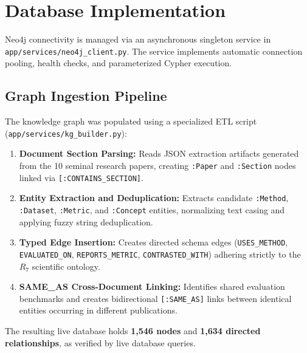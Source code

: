 \section{Database Implementation}
Neo4j connectivity is managed via an asynchronous singleton service in \texttt{app/services/neo4j_client.py}. The service implements automatic connection pooling, health checks, and parameterized Cypher execution.

\subsection{Graph Ingestion Pipeline}
The knowledge graph was populated using a specialized ETL script (\texttt{app/services/kg_builder.py}):
\begin{enumerate}
    \item \textbf{Document Section Parsing:} Reads JSON extraction artifacts generated from the 10 seminal research papers, creating \texttt{:Paper} and \texttt{:Section} nodes linked via \texttt{[:CONTAINS_SECTION]}.
    \item \textbf{Entity Extraction and Deduplication:} Extracts candidate \texttt{:Method}, \texttt{:Dataset}, \texttt{:Metric}, and \texttt{:Concept} entities, normalizing text casing and applying fuzzy string deduplication.
    \item \textbf{Typed Edge Insertion:} Creates directed schema edges (\texttt{USES\_METHOD}, \texttt{EVALUATED\_ON}, \texttt{REPORTS\_METRIC}, \texttt{CONTRASTED\_WITH}) adhering strictly to the $R_7$ scientific ontology.
    \item \textbf{SAME\_AS Cross-Document Linking:} Identifies shared evaluation benchmarks and creates bidirectional \texttt{[:SAME_AS]} links between identical entities occurring in different publications.
\end{enumerate}

The resulting live database holds \textbf{1,546 nodes} and \textbf{1,634 directed relationships}, as verified by live database queries.

